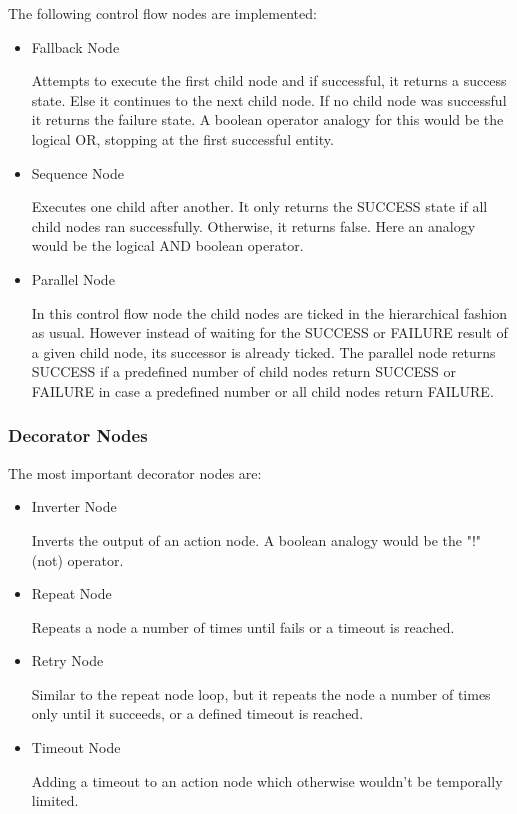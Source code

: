 The following control flow nodes are implemented:

\begin{itemize}
    \item Fallback Node
    
    Attempts to execute the first child node and if successful, it returns a success state. Else it continues to the next child node. If no child node was successful it returns the failure state. A boolean operator analogy for this would be the logical OR, stopping at the first successful entity.
    \item Sequence Node
    
    Executes one child after another. It only returns the SUCCESS state if all child nodes ran successfully. Otherwise, it returns false. Here an analogy would be the logical AND boolean operator.

    \item Parallel Node
    
    In this control flow node the child nodes are ticked in the hierarchical fashion as usual. However instead of waiting for the SUCCESS or FAILURE result of a given child node, its successor is already ticked. The parallel node returns SUCCESS if a predefined number of child nodes return SUCCESS or FAILURE in case a predefined number or all child nodes return FAILURE.
\end{itemize}

\subsubsection{Decorator Nodes}\label{subsubsec:decorator_nodes}

The most important decorator nodes are:

\begin{itemize}
    \item Inverter Node
    
    Inverts the output of an action node. A boolean analogy would be the "!" (not) operator.
    \item Repeat Node
    
    Repeats a node a number of times until fails or a timeout is reached. 
    \item Retry Node
    
    Similar to the repeat node loop, but it repeats the node a number of times only until it succeeds, or a defined timeout is reached.
    \item Timeout Node
    
    Adding a timeout to an action node which otherwise wouldn't be temporally limited.
\end{itemize}

